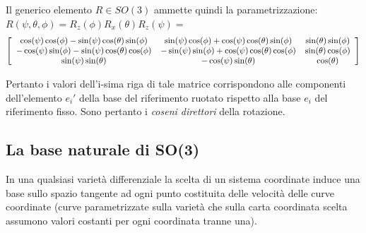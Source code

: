 \documentclass[11pt]{report}
\theoremstyle{plain}
\theoremstyle{definition}
\theoremstyle{remark}
\begin{document}
Il generico elemento  $R \in SO(3)$ ammette quindi la parametrizzazione: $R(\psi , \theta , \phi) = R_{z}(\phi)R_{x}(\theta)R_{z}(\psi) = $
\begin{equation}\label{eq:genericoReulero}\small
\left[ \begin{array}{ccc}
\cos(\psi)\cos(\phi) -\sin(\psi)\cos(\theta)\sin(\phi) & \sin(\psi)\cos(\phi) + \cos(\psi)\cos(\theta)\sin(\phi) & \sin(\theta)\sin(\phi)  \\
-\cos(\psi)\sin(\phi) -\sin(\psi)\cos(\theta)\cos(\phi) & -\sin(\psi)\sin(\phi) + \cos(\psi)\cos(\theta)\cos(\phi) & \sin(\theta)\cos(\phi)  \\
\sin(\psi)\sin(\theta) & -\cos(\psi)\sin(\theta) & \cos(\theta) \\
\end{array} \right]
\end{equation}	

Pertanto i valori dell'i-sima riga di tale matrice corrispondono alle componenti dell'elemento $e_{i}'$ della base del riferimento ruotato rispetto alla base $e_{i}$ del riferimento fisso. Sono pertanto i \emph{coseni direttori} della rotazione.

\subsection{La base naturale di SO(3)}

In una qualsiasi varietà differenziale la scelta di un sistema coordinate induce una base sullo spazio tangente ad ogni punto costituita delle velocità delle curve coordinate (curve parametrizzate sulla varietà che sulla carta coordinata scelta assumono valori costanti per ogni coordinata tranne una).
\end{document}
